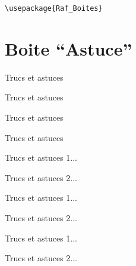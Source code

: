 \documentclass[a4paper,12pt]{article}
\begin{document}
		\begin{lstlisting}
\usepackage{Raf_Boites}
		\end{lstlisting}



	\section{Boite ``Astuce''}

\begin{code}%
\begin{astuce}
	Trucs et astuces
\end{astuce}
\end{code}

\begin{astuce}
	Trucs et astuces
\end{astuce}%

\begin{code}%
\begin{astuce*}
	Trucs et astuces
\end{astuce*}
\end{code}

\begin{astuce*}
	Trucs et astuces
\end{astuce*}%

\begin{code}%
\begin{astuces}
	\item Trucs et astuces 1...
	\item Trucs et astuces 2...
\end{astuces}
\end{code}

\begin{astuces}
	\item Trucs et astuces 1...
	\item Trucs et astuces 2...
\end{astuces}%

\begin{code}%
\begin{astuces*}
	\item Trucs et astuces 1...
	\item Trucs et astuces 2...
\end{astuces*}
\end{code}
\end{document}
